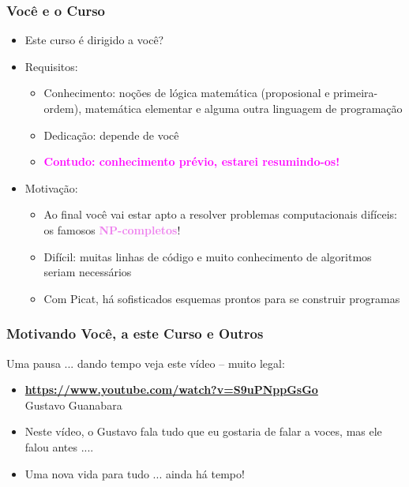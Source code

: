 \begin{frame}[fragile]
  \frametitle{Você e o Curso}
  \begin{itemize}

    \item Este curso é dirigido a você?
  \pause
    \item Requisitos:
   \pause
		\begin{itemize}
			\item Conhecimento: noções de lógica matemática 
			(proposional e primeira-ordem), matemática elementar
			e alguma outra linguagem de programação

			\item Dedicação: depende de você
			\pause
		\item \textcolor{magenta}{\textbf{Contudo: conhecimento prévio, estarei resumindo-os!}}
		\end{itemize}
		
  \pause
    \item Motivação:
   \pause
		\begin{itemize}
			\item Ao final você vai estar apto a resolver problemas
			computacionais difíceis: os famosos \textcolor{violet}{\textbf{NP-completos}}!
			
			\item Difícil: muitas linhas de código e muito 
			conhecimento de algoritmos seriam necessários
			
			\item Com Picat, há sofisticados esquemas prontos para se 
			construir programas

		\end{itemize}

  \end{itemize}

\end{frame}


\begin{frame}[fragile]
  \frametitle{Motivando Você, a este Curso e Outros}

\begin{block}{Uma pausa ... dando tempo veja este vídeo -- muito legal:}

\begin{itemize}
  \item \textcolor{magenta}{\textbf{\url{https://www.youtube.com/watch?v=S9uPNppGsGo}}}\\
Gustavo Guanabara 

\pause
\item Neste vídeo, o Gustavo fala tudo que eu gostaria
de falar a voces, mas ele falou  antes ....


\pause
\item Uma nova vida para tudo ... ainda há tempo!


\end{itemize}

\end{block}


\end{frame}


